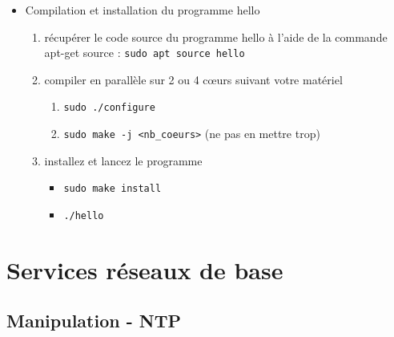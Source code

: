 \documentclass[a4paper]{article}
\begin{document}
\begin{itemize}
\item Compilation et installation du programme hello
\begin{enumerate}
    \item récupérer le code source du programme hello à l’aide de la commande apt-get source : \texttt{sudo apt source hello}
    \item compiler en parallèle sur 2 ou 4 cœurs suivant votre matériel
    \begin{example}
        \begin{enumerate}
            \item \texttt{sudo ./configure}
            \item \texttt{sudo make -j <nb\_coeurs>} (ne pas en mettre trop)
        \end{enumerate}
    \end{example}
    \item installez et lancez le programme
    \begin{example}
        \begin{itemize}
            \item \texttt{sudo make install}
            \item \texttt{./hello}
        \end{itemize}
    \end{example}
\end{enumerate}

\end{itemize}















\section{Services réseaux de base}










\subsection{Manipulation - NTP}
\end{document}
